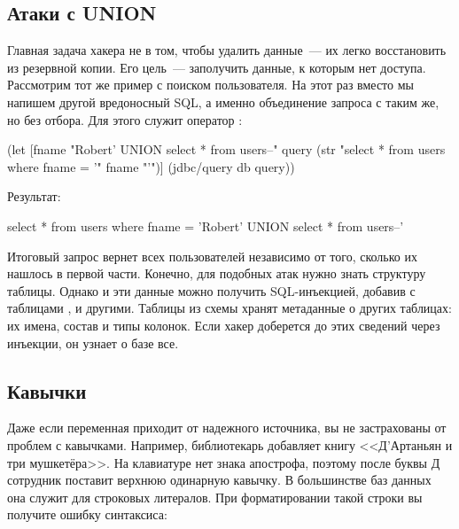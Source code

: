 \subsection{Атаки с UNION}

Главная задача хакера не в том, чтобы удалить данные~--- их легко восстановить из резервной копии. Его цель~--- заполучить данные, к которым нет доступа. Рассмотрим тот же пример с поиском пользователя. На этот раз вместо  мы напишем другой вредоносный SQL, а именно объединение запроса с таким же, но без отбора. Для этого служит оператор :

\begin{english}
  \begin{clojure}
(let [fname
      "Robert' UNION select * from users--"
      query
      (str "select * from users where fname = '"
           fname
           "'")]
  (jdbc/query db query))
  \end{clojure}
\end{english}

Результат:

\begin{english}
  \begin{sql}
select * from users where fname = 'Robert'
UNION select * from users--'
  \end{sql}
\end{english}

Итоговый запрос вернет всех пользователей независимо от того, сколько их нашлось в первой части. Конечно, для подобных атак нужно знать структуру таблицы. Однако и эти данные можно получить SQL-инъекцией, добавив  с таблицами ,  и другими. Таблицы из схемы  хранят метаданные о других таблицах: их имена, состав и типы колонок. Если хакер доберется до этих сведений через инъекции, он узнает о базе все.

\subsection{Кавычки}

Даже если переменная приходит от надежного источника, вы не застрахованы от проблем с кавычками. Например, библиотекарь добавляет книгу <<Д’Артаньян и три мушкетёра>>. На клавиатуре нет знака апострофа, поэтому после буквы Д сотрудник поставит верхнюю одинарную кавычку. В большинстве баз данных она служит для строковых литералов. При форматировании такой строки вы получите ошибку синтаксиса:


